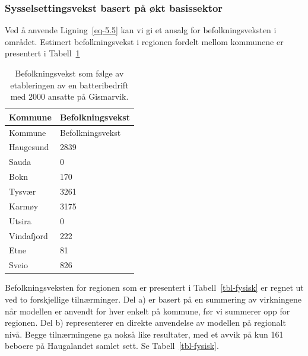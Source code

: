 \documentclass[
]{article}
\begin{document}
\hypertarget{sysselsettingsvekst-basert-puxe5-uxf8kt-basissektor}{%
\subsubsection{Sysselsettingsvekst basert på økt
basissektor}\label{sysselsettingsvekst-basert-puxe5-uxf8kt-basissektor}}

Ved å anvende Ligning~\ref{eq-5.5} kan vi gi et ansalg for
befolkningsveksten i området. Estimert befolkningsvekst i regionen
fordelt mellom kommunene er presentert i Tabell~\ref{tbl-befolkning}

\hypertarget{tbl-befolkning}{}
\begin{longtable}[]{@{}ll@{}}
\caption{\label{tbl-befolkning}Befolkningsvekst som følge av
etableringen av en batteribedrift med 2000 ansatte på
Gismarvik.}\tabularnewline
\toprule()
Kommune & Befolkningsvekst \\
\midrule()
\endfirsthead
\toprule()
Kommune & Befolkningsvekst \\
\midrule()
\endhead
Haugesund & 2839 \\
Sauda & 0 \\
Bokn & 170 \\
Tysvær & 3261 \\
Karmøy & 3175 \\
Utsira & 0 \\
Vindafjord & 222 \\
Etne & 81 \\
Sveio & 826 \\
\bottomrule()
\end{longtable}

Befolkningsveksten for regionen som er presentert i
Tabell~\ref{tbl-fysisk} er regnet ut ved to forskjellige tilnærminger.
Del a) er basert på en summering av virkningene når modellen er anvendt
for hver enkelt på kommune, før vi summerer opp for regionen. Del b)
representerer en direkte anvendelse av modellen på regionalt nivå. Begge
tilnærmingene ga nokså like resultater, med et avvik på kun 161 beboere
på Haugalandet samlet sett. Se Tabell~\ref{tbl-fysisk}.
\end{document}
